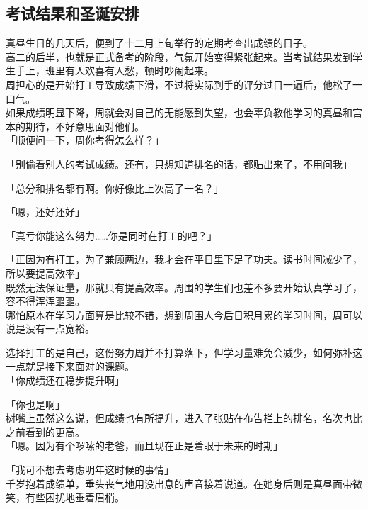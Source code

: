 \subsection{考试结果和圣诞安排}

真昼生日的几天后，便到了十二月上旬举行的定期考查出成绩的日子。\\

高二的后半，也就是正式备考的阶段，气氛开始变得紧张起来。当考试结果发到学生手上，班里有人欢喜有人愁，顿时吵闹起来。\\

周担心的是开始打工导致成绩下滑，不过将实际到手的评分过目一遍后，他松了一口气。\\

如果成绩明显下降，周就会对自己的无能感到失望，也会辜负教他学习的真昼和宫本的期待，不好意思面对他们。\\

「顺便问一下，周你考得怎么样？」

「别偷看别人的考试成绩。还有，只想知道排名的话，都贴出来了，不用问我」

「总分和排名都有啊。你好像比上次高了一名？」

「嗯，还好还好」

「真亏你能这么努力……你是同时在打工的吧？」

「正因为有打工，为了兼顾两边，我才会在平日里下足了功夫。读书时间减少了，所以要提高效率」\\

既然无法保证量，那就只有提高效率。周围的学生们也差不多要开始认真学习了，容不得浑浑噩噩。\\

哪怕原本在学习方面算是比较不错，想到周围人今后日积月累的学习时间，周可以说是没有一点宽裕。

选择打工的是自己，这份努力周并不打算落下，但学习量难免会减少，如何弥补这一点就是接下来面对的课题。\\

「你成绩还在稳步提升啊」

「你也是啊」\\

树嘴上虽然这么说，但成绩也有所提升，进入了张贴在布告栏上的排名，名次也比之前看到的更高。\\

「嗯。因为有个啰嗦的老爸，而且现在正是着眼于未来的时期」

「我可不想去考虑明年这时候的事情」\\

千岁抱着成绩单，垂头丧气地用没出息的声音接着说道。在她身后则是真昼面带微笑，有些困扰地垂着眉梢。

